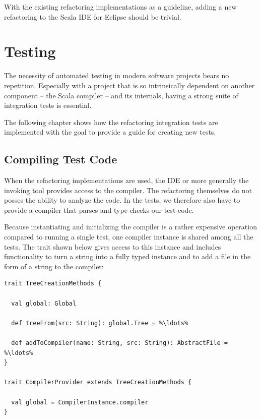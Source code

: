\documentclass[10pt,a4paper,oneside]{scrreprt}
\begin{document}
With the existing refactoring implementations as a guideline, adding a new refactoring to the Scala IDE for Eclipse should be trivial.

\label{end-chapter:tool-integration}

\chapter{Testing} \label{chapter:testing}

The necessity of automated testing in modern software projects bears no repetition. Especially with a project that is so intrinsically dependent on another component -- the Scala compiler -- and its internals, having a strong suite of integration tests is essential. 

The following chapter shows how the refactoring integration tests are implemented with the goal to provide a guide for creating new tests.

\section{Compiling Test Code}

When the refactoring implementations are used, the IDE or more generally the invoking tool provides access to the compiler. The refactoring themselves do not posses the ability to analyze the code. In the tests, we therefore also have to provide a compiler that parses and type-checks our test code.

Because instantiating and initializing the compiler is a rather expensive operation compared to running a single test, one compiler instance is shared among all the tests. The  trait shown below gives access to this instance and includes functionality to turn a string into a fully typed  instance and to add a file in the form of a string to the compiler:

\begin{lstlisting}
trait TreeCreationMethods {
  
  val global: Global
    
  def treeFrom(src: String): global.Tree = %\ldots%
  
  def addToCompiler(name: String, src: String): AbstractFile = %\ldots%
}

trait CompilerProvider extends TreeCreationMethods {

  val global = CompilerInstance.compiler
}
\end{lstlisting}
\end{document}
